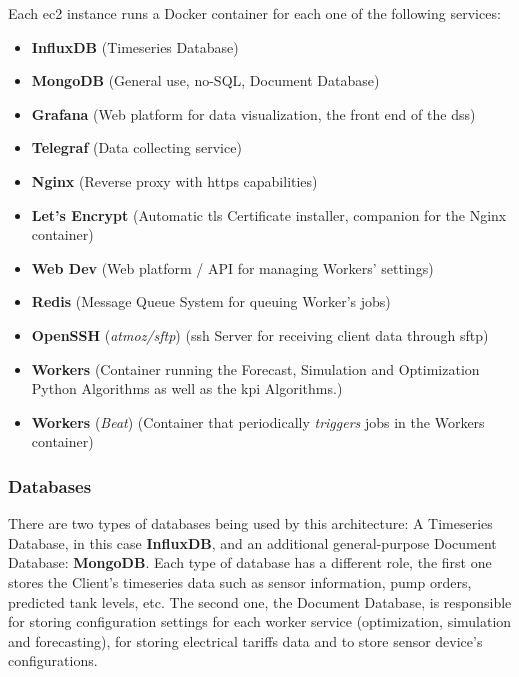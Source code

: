 Each \gls{ec2} instance runs a Docker container for each one of the following services:

\begin{itemize}

\item \textbf{InfluxDB} (Timeseries Database)
\item \textbf{MongoDB} (General use, no-SQL, Document Database)
\item \textbf{Grafana} (Web platform for data visualization, the front end of the \gls{dss})
\item \textbf{Telegraf} (Data collecting service)
\item \textbf{Nginx} (Reverse proxy with \gls{https} capabilities)
\item \textbf{Let's Encrypt} (Automatic \gls{tls} Certificate installer, companion for the Nginx container)
\item \textbf{Web Dev} (Web platform / API for managing Workers' settings)
\item \textbf{Redis} (Message Queue System for queuing Worker's jobs)
\item \textbf{OpenSSH} (\textit{atmoz/sftp}) (\gls{ssh} Server for receiving client data through \gls{sftp})
\item \textbf{Workers} (Container running the Forecast, Simulation and Optimization Python Algorithms as well as the \gls{kpi} Algorithms.)
\item \textbf{Workers} (\textit{Beat}) (Container that periodically \textit{triggers} jobs in the Workers container)

\end{itemize}




\subsubsection{Databases}\label{methodology:sss:databases}

There are two types of databases being used by this architecture: A Timeseries Database, in this case \textbf{InfluxDB}, and an additional general-purpose Document Database: \textbf{MongoDB}. Each type of database has a different role, the first one stores the Client's timeseries data such as sensor information, pump orders, predicted tank levels, etc.
The second one, the Document Database, is responsible for storing configuration settings for each worker service (optimization, simulation and forecasting), for storing electrical tariffs data and to store sensor device's configurations.

